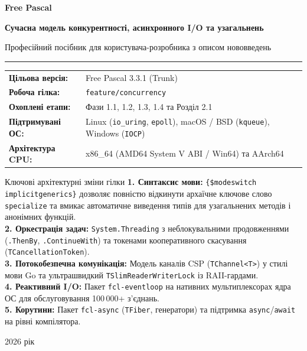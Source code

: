 \documentclass[11pt,a4paper]{article}
\begin{document}
\begin{titlepage}
  \centering
  \vspace*{15mm}
  {\Huge\bfseries\color{primarydark} Free Pascal\par}
  \vspace{4mm}
  {\LARGE\bfseries Сучасна модель конкурентності, асинхронного I/O та узагальнень\par}
  \vspace{2mm}
  {\large Професійний посібник для користувача-розробника з описом нововведень\par}
  \vspace{10mm}
  \rule{0.6\textwidth}{1.2pt}\par
  \vspace{10mm}
  
  \begin{tabular}{ll}
    \textbf{Цільова версія:} & Free Pascal 3.3.1 (Trunk) \\
    \textbf{Робоча гілка:} & \texttt{feature/concurrency} \\
    \textbf{Охоплені етапи:} & Фази 1.1, 1.2, 1.3, 1.4 та Розділ 2.1 \\
    \textbf{Підтримувані ОС:} & Linux (\texttt{io\_uring}, \texttt{epoll}), macOS / BSD (\texttt{kqueue}), Windows (\texttt{IOCP}) \\
    \textbf{Архітектура CPU:} & x86\_64 (AMD64 System V ABI / Win64) та AArch64 \\
  \end{tabular}
  
  \vfill
  
  \begin{infobox}{Ключові архітектурні зміни гілки}
    \small
    \textbf{1. Синтаксис мови:} \texttt{\{\$modeswitch implicitgenerics\}} дозволяє повністю відкинути архаїчне ключове слово \texttt{specialize} та вмикає автоматичне виведення типів для узагальнених методів і анонімних функцій.\\
    \textbf{2. Оркестрація задач:} \texttt{System.Threading} з неблокувальними продовженнями (\texttt{.ThenBy}, \texttt{.ContinueWith}) та токенами кооперативного скасування (\texttt{TCancellationToken}).\\
    \textbf{3. Потокобезпечна комунікація:} Модель каналів CSP (\texttt{TChannel<T>}) у стилі мови Go та ультрашвидкий \texttt{TSlimReaderWriterLock} із RAII-гардами.\\
    \textbf{4. Реактивний I/O:} Пакет \texttt{fcl-eventloop} на нативних мультиплексорах ядра ОС для обслуговування 100\,000+ з'єднань.\\
    \textbf{5. Корутини:} Пакет \texttt{fcl-async} (\texttt{TFiber}, генератори) та підтримка \texttt{async}/\texttt{await} на рівні компілятора.
  \end{infobox}
  
  \vspace{10mm}
  {\small\color{muted} 2026 рік}
\end{titlepage}
\end{document}
